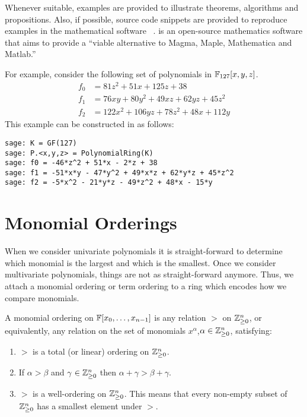 Whenever suitable, examples are provided to illustrate theorems, algorithms and propositions. Also, if possible, source code snippets are provided to reproduce examples in the mathematical software \Sage~\cite{sage}. \Sage is an open-source mathematics software that aims to provide a ``viable alternative to Magma, Maple, Mathematica and Matlab.''

For example, consider the following set of polynomials in $\mathbb{F}_{127}[x,y,z]$.
\begin{align*}
f_0 &= 81 z^{2} + 51 x + 125 z + 38\\
f_1 &= 76 x y + 80 y^{2} + 49 x z + 62 y z + 45 z^{2}\\
f_2 &= 122 x^{2} + 106 y z + 78 z^{2} + 48 x + 112 y
\end{align*}
This example can be constructed in \Sage as follows:
\begin{lstlisting}
sage: K = GF(127)
sage: P.<x,y,z> = PolynomialRing(K)
sage: f0 = -46*z^2 + 51*x - 2*z + 38
sage: f1 = -51*x*y - 47*y^2 + 49*x*z + 62*y*z + 45*z^2
sage: f2 = -5*x^2 - 21*y*z - 49*z^2 + 48*x - 15*y
\end{lstlisting}

\section{Monomial Orderings}
When we consider univariate polynomials it is straight-forward to determine which monomial is the largest and which is the smallest. Once we consider multivariate polynomials, things are not as straight-forward anymore. Thus, we attach a monomial ordering or term ordering to a ring which encodes how we compare monomials.

\begin{definition}
A monomial ordering on $\mathbb{F}[x_0,\dots,x_{n-1}]$ is any relation $>$ on $\mathbb{Z}_{\geq 0}^n$, or equivalently, any relation on the set of monomials $x^\alpha$,$\alpha \in \mathbb{Z}_{\geq 0}^n$, satisfying:
\begin{enumerate}
 \item $>$ is a total (or linear) ordering on $\mathbb{Z}_{\geq 0}^n$.
 \item If $\alpha > \beta$ and $\gamma$ $\in \mathbb{Z}_{\geq 0}^n$ then $\alpha + \gamma > \beta + \gamma$.
 \item $>$ is a well-ordering on $\mathbb{Z}_{\geq 0}^n$. This means that every non-empty subset of $\mathbb{Z}_{\geq 0}^n$ has a smallest element under $>$.
\end{enumerate}

\end{definition}

